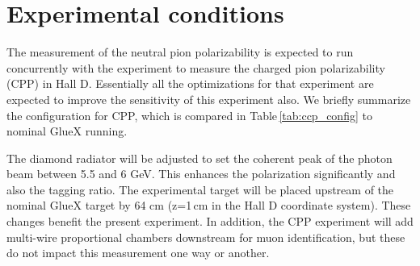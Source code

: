 
\section{Experimental conditions}
The measurement of the neutral pion polarizability is expected to run
concurrently with the experiment to measure the charged pion
polarizability (CPP) \cite{CPPexp} in Hall D. Essentially all the
optimizations for that experiment are expected to improve the
sensitivity of this experiment also. We briefly summarize the
configuration for CPP, which is compared in
Table\,\ref{tab:ccp_config} to nominal GlueX running.  
 
The diamond radiator will be adjusted to set the coherent peak of the
photon beam between 5.5 and 6 GeV. This enhances the polarization
significantly and also the tagging ratio.  The experimental target
will be placed upstream of the nominal GlueX target by 64 cm (z=1\,cm
in the Hall D coordinate system). These changes benefit the present
experiment. In addition, the CPP experiment will add multi-wire
proportional chambers downstream for muon identification, but these do
not impact this measurement one way or another.
 
